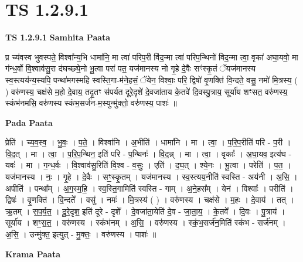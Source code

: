 \documentclass[17pt]{extarticle}
\begin{document}
\section*{ TS 1.2.9.1 }

\textbf{TS 1.2.9.1 } \newline
\textbf{Samhita Paata} \newline

प्र च्य॑वस्व भुवस्पते॒ विश्वा᳚न्य॒भि धामा॑नि॒ मा त्वा॑ परिप॒री वि॑द॒न्मा त्वा॑ परिप॒न्थिनो॑ विद॒न्मा त्वा॒ वृका॑ अघा॒यवो॒ मा ग॑न्ध॒र्वो वि॒श्वाव॑सु॒रा द॑घच्छ्ये॒नो भू॒त्वा परा॑ पत॒ यज॑मानस्य नो गृ॒हे दे॒वैः सꣳ॑स्कृ॒तं ॅयज॑मानस्य स्व॒स्त्यय॑न्य॒स्यपि॒ पन्था॑मगस्महि स्वस्ति॒गा-म॑ने॒हसं॒ ॅयेन॒ विश्वाः॒ परि॒ द्विषो॑ वृ॒णक्ति॑ वि॒न्दते॒ वसु॒ नमो॑ मि॒त्रस्य॒ ( ) वरु॑णस्य॒ चक्ष॑से म॒हो दे॒वाय॒ तदृ॒तꣳ स॑पर्यत दूरे॒दृशे॑ दे॒वजा॑ताय के॒तवे॑ दि॒वस्पु॒त्राय॒ सूर्या॑य शꣳसत॒ वरु॑णस्य॒ स्कंभ॑नमसि॒ वरु॑णस्य स्कंभ॒सर्ज॑न-म॒स्युन्मु॑क्तो॒ वरु॑णस्य॒ पाशः॑ ॥ \newline

\textbf{Pada Paata} \newline

प्रेति॑ । च्य॒व॒स्व॒ । भु॒वः॒ । प॒ते॒ । विश्वा॑नि । अ॒भीति॑ । धामा॑नि । मा । त्वा॒ । प॒रि॒प॒रीति॑ परि - प॒री । वि॒द॒त् । मा । त्वा॒ । प॒रि॒प॒न्थिन॒ इति॑ परि - प॒न्थिनः॑ । वि॒द॒न्न् । मा । त्वा॒ । वृकाः᳚ । अ॒घा॒यव॒ इत्य॑घ - यवः॑ । मा । ग॒न्ध॒र्वः । वि॒श्वाव॑सु॒रिति॑ वि॒श्व - व॒सुः॒ । एति॑ । द॒घ॒त् । श्ये॒नः । भू॒त्वा । परेति॑ । प॒त॒ । यज॑मानस्य । नः॒ । गृ॒हे । दे॒वैः । सꣳ॒॒स्कृ॒तम् । यज॑मानस्य । स्व॒स्त्यय॒नीति॑ स्वस्ति - अय॑नी । अ॒सि॒ । अपीति॑ । पन्था᳚म् । अ॒ग॒स्म॒हि॒ । स्व॒स्ति॒गामिति॑ स्वस्ति - गाम् । अ॒ने॒हस᳚म् । येन॑ । विश्वाः᳚ । परीति॑ । द्विषः॑ । वृ॒णक्ति॑ । वि॒न्दते᳚ । वसु॑ । नमः॑ । मि॒त्रस्य॑ ( ) । वरु॑णस्य । चक्ष॑से । म॒हः । दे॒वाय॑ । तत् । ऋ॒तम् । स॒प॒र्य॒त॒ । दू॒रे॒दृश॒ इति॑ दूरे - दृशे᳚ । दे॒वजा॑ता॒येति॑ दे॒व - जा॒ता॒य॒ । के॒तवे᳚ । दि॒वः । पु॒त्राय॑ । सूर्या॑य । शꣳ॒॒स॒त॒ । वरु॑णस्य । स्कंभ॑नम् । अ॒सि॒ । वरु॑णस्य । स्कं॒भ॒सर्ज॑न॒मिति॑ स्कंभ - सर्ज॑नम् । अ॒सि॒ । उन्मु॑क्त॒ इत्युत् - मु॒क्तः॒ । वरु॑णस्य । पाशः॑ ॥  \newline


\textbf{Krama Paata} \newline
\end{document}
